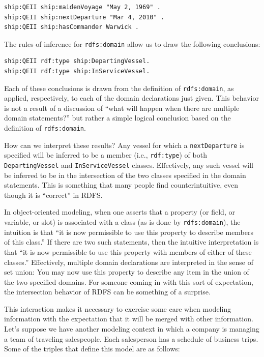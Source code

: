 \begin{lstlisting}
ship:QEII ship:maidenVoyage "May 2, 1969" .
ship:QEII ship:nextDeparture "Mar 4, 2010" .
ship:QEII ship:hasCommander Warwick .
\end{lstlisting}

The rules of inference for \texttt{rdfs:domain} allow us to draw the following
conclusions:

\begin{lstlisting}
ship:QEII rdf:type ship:DepartingVessel.
ship:QEII rdf:type ship:InServiceVessel.
\end{lstlisting}

Each of these conclusions is drawn from the definition of \texttt{rdfs:domain},
as applied, respectively, to each of the domain declarations just given.
This behavior is not a result of a discussion of ``what will happen when
there are multiple domain statements?'' but rather a simple logical
conclusion based on the definition of \texttt{rdfs:domain}.

How can we interpret these results? Any vessel for which a \texttt{nextDeparture}
is specified will be
inferred to be a member (i.e., \texttt{rdf:type}) of both \texttt{DepartingVessel} and
\texttt{InServiceVessel} classes. Effectively, any such vessel will be inferred
to be in the intersection of the two classes specified in the domain
statements. This is something that many people find counterintuitive,
even though it is ``correct'' in RDFS.

In object-oriented modeling, when one asserts that a property (or field,
or variable, or slot) is associated with a class (as is done by
\texttt{rdfs:domain}), the intuition is that ``it is now permissible to use this
property to describe members of this class.'' If there are two such
statements, then the intuitive interpretation is that ``it is now
permissible to use this property with members of either of these
classes.'' Effectively, multiple domain declarations are interpreted in
the sense of set union: You may now use this property to describe any
item in the union of the two specified domains. For someone coming in
with this sort of expectation, the intersection behavior of RDFS can be
something of a surprise.

This interaction makes it necessary to exercise some care when modeling
information with the expectation that it will be merged with other
information. Let's suppose we have another modeling context in which a
company is managing a team of traveling salespeople. Each salesperson
has a schedule of business trips. Some of the triples that define this
model are as follows:

